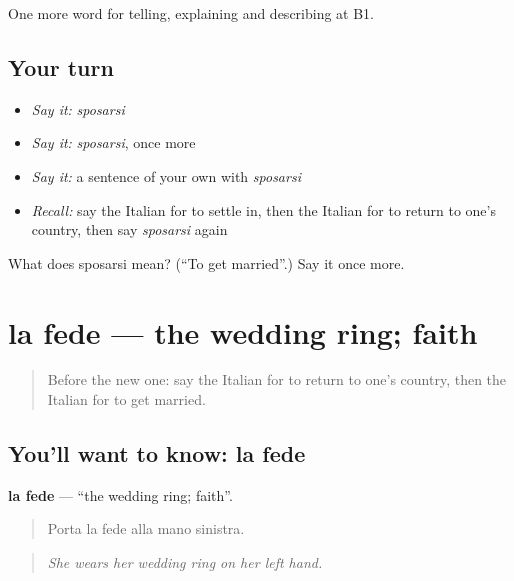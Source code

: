 \begin{grammarlens}[title={What you've built}]
One more word for telling, explaining and describing at B1.
\end{grammarlens}

\subsection*{Your turn}
\begin{itemize}
\raggedright
  \item \emph{Say it:} \emph{sposarsi}
  \item \emph{Say it:} \emph{sposarsi}, once more
  \item \emph{Say it:} a sentence of your own with \emph{sposarsi}
  \item \emph{Recall:} say the Italian for to settle in, then the Italian for to return to one's country, then say \emph{sposarsi} again
\end{itemize}

\begin{tcolorbox}[breakable,colback=teal!4,colframe=teal!35!black,title={Before you move on}]
What does sposarsi mean? (\textquotedblleft{}To get married\textquotedblright{}.) Say it once more.
\end{tcolorbox}
\section[la fede]{la fede — the wedding ring; faith}

\label{lesson:IT-C311-fede}



\begin{quote}
Before the new one: say the Italian for to return to one's country, then the Italian for to get married.
\end{quote}

\subsection*{You'll want to know: la fede}
\textbf{la fede} — \textquotedblleft{}the wedding ring; faith\textquotedblright{}.

\begin{quote}
Porta la fede alla mano sinistra.
\end{quote}

\begin{quote}
\emph{She wears her wedding ring on her left hand.}
\end{quote}


